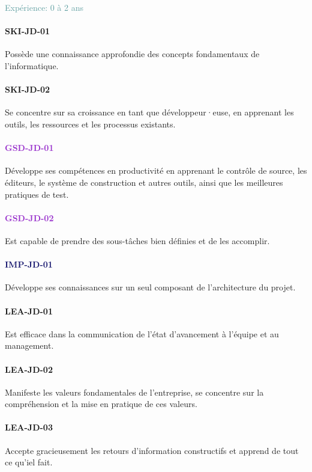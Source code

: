 \documentclass[a4paper, french, openany, 12pt]{book}
\newcommand\dex[1]{\textcolor{BrickRed}{\textbf{\uppercase{ski-{#1}}}}}
\newcommand\str[1]{\textcolor{DarkOrchid}{\textbf{\uppercase{gsd-{#1}}}}}
\newcommand\wis[1]{\textcolor{MidnightBlue}{\textbf{\uppercase{imp-{#1}}}}}
\newcommand\cha[1]{\textcolor{OliveGreen}{\textbf{\uppercase{lea-{#1}}}}}
\newcommand\xp[1]{\textcolor{CadetBlue}{Expérience: {#1} ans}}
\newcommand\dev{développeur·euse}
\begin{document}
\xp{0 à 2}

\begin{multicols}{2}

  \paragraph{\dex{jd-01}}

  Possède une connaissance approfondie des concepts fondamentaux de l'informatique.

  \paragraph{\dex{jd-02}}

  Se concentre sur sa croissance en tant que \dev, en apprenant les outils, les ressources et les processus
  existants.

  \paragraph{\str{jd-01}}

  Développe ses compétences en productivité en apprenant le contrôle de source, les éditeurs, le système de construction
  et autres outils, ainsi que les meilleures pratiques de test.

  \paragraph{\str{jd-02}}

  Est capable de prendre des sous-tâches bien définies et de les accomplir.

  \paragraph{\wis{jd-01}}

  Développe ses connaissances sur un seul composant de l'architecture du projet.

  \paragraph{\cha{jd-01}}

  Est efficace dans la communication de l'état d'avancement à l'équipe et au management.

  \paragraph{\cha{jd-02}}

  Manifeste les valeurs fondamentales de l'entreprise, se concentre sur la compréhension et la mise en pratique de ces
  valeurs.

  \paragraph{\cha{jd-03}}

  Accepte gracieusement les retours d'information constructifs et apprend de tout ce qu'iel fait.
\end{multicols}
\end{document}
